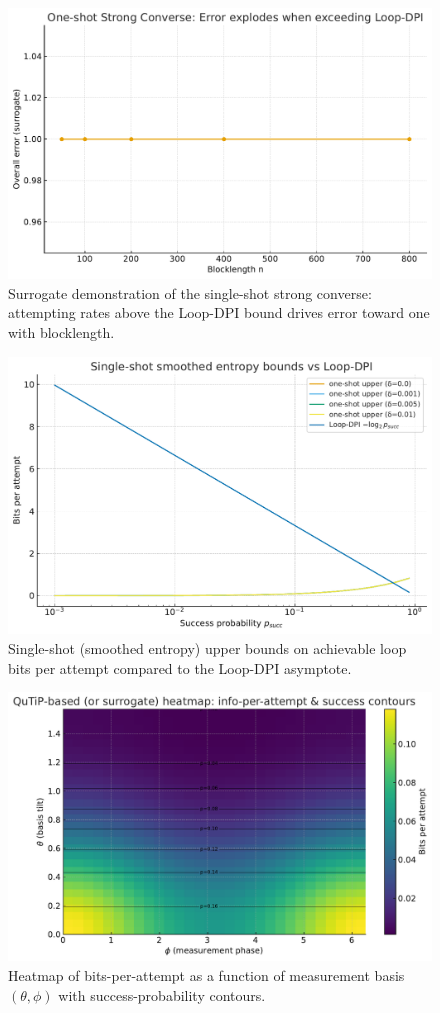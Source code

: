 \begin{figure}[h]
\centering
\includegraphics[width=0.7\linewidth]{figures/one_shot_converse.pdf}
\caption{Surrogate demonstration of the single-shot strong converse: attempting rates above the Loop-DPI bound drives error toward one with blocklength.}
\end{figure}


\begin{figure}[h]
\centering
\includegraphics[width=0.7\linewidth]{figures/one_shot_smoothed.pdf}
\caption{Single-shot (smoothed entropy) upper bounds on achievable loop bits per attempt compared to the Loop-DPI asymptote.}
\end{figure}

\begin{figure}[h]
\centering
\includegraphics[width=0.75\linewidth]{figures/qutip_heatmap.pdf}
\caption{Heatmap of bits-per-attempt as a function of measurement basis $(\theta,\phi)$ with success-probability contours.}
\end{figure}
